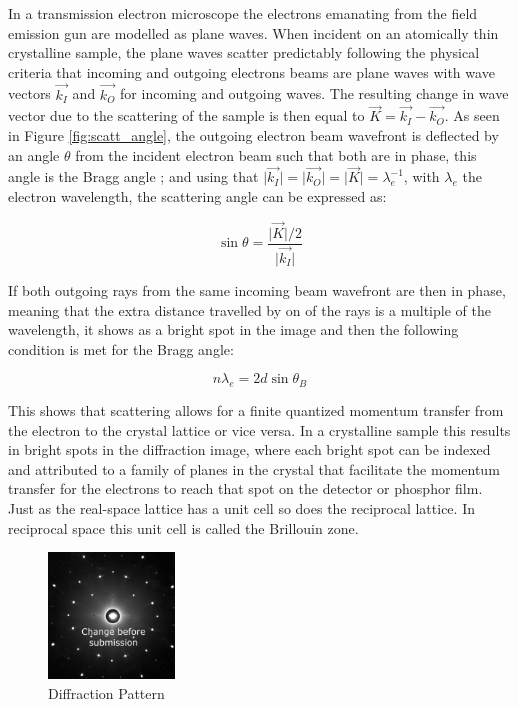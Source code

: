 In a transmission electron microscope the electrons emanating from the field emission gun are modelled as plane waves. When incident on an atomically thin crystalline sample, the plane waves scatter predictably following the physical criteria that incoming and outgoing electrons beams are plane waves with wave vectors $\vec{k_I}$ and $\vec{k_O}$ for incoming and outgoing waves. The resulting change in wave vector due to the scattering of the sample is then equal to $\vec{K} = \vec{k_I}-\vec{k_O}$. As seen in Figure \ref{fig:scatt_angle}, the outgoing electron beam wavefront is deflected by an angle $\theta$ from the incident electron beam such that both are in phase, this angle is the Bragg angle \cite{Williams2009-ww}; and using that $\vert \vec{k_I} \vert = \vert \vec{k_O} \vert = \vert \vec{K} \vert =\lambda_e^{-1}$, with $\lambda_e$ the electron wavelength, the scattering angle can be expressed as:

\begin{equation}
    \sin{\theta}=\frac{\vert \vec{K}\vert / 2}{\vert \vec{k_I}\vert}
    \label{eq:bragg_angle}
\end{equation}

If both outgoing rays from the same incoming beam wavefront are then in phase, meaning that the extra distance travelled by on of the rays is a multiple of the wavelength, it shows as a bright spot in the image and then the following condition is met for the Bragg angle:

\begin{equation}
    n \lambda_e = 2 d \sin{\theta_B}
    \label{eq:bragg_angle_ser}
\end{equation}

This shows that scattering allows for a finite quantized momentum transfer from the electron to the crystal lattice or vice versa. In a crystalline sample this results in bright spots in the diffraction image, where each bright spot can be indexed and attributed to a family of planes in the crystal that facilitate the momentum transfer for the electrons to reach that spot on the detector or phosphor film.
Just as the real-space lattice has a unit cell so does the reciprocal lattice. In reciprocal space this unit cell is called the Brillouin zone.

\begin{figure}
    \centering
    \includegraphics[width=0.3\textwidth, keepaspectratio]{resources/Figures/dp.png}
    \caption{Diffraction Pattern}
    \label{fig:diffraction_pattern}
\end{figure}

